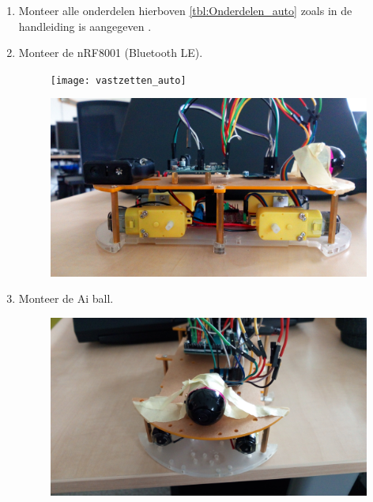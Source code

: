 \documentclass[12pt,a4paper]{article}
\begin{document}
\begin{enumerate}
	\item Monteer alle onderdelen hierboven \ref{tbl:Onderdelen_auto} zoals in de handleiding is aangegeven \cite{DIY_auto_hl}. 
	\item Monteer de nRF8001 (Bluetooth LE).
	\begin{figure}[H]
	\centering
	\texttt{[image: vastzetten\_auto]}
	\label{fig:vastzetten_auto}
	\end{figure}
	\begin{figure}[H]
		\centering
		\includegraphics[width=0.7\linewidth]{zijkant}
		\label{fig:vastzetten_zijkant_auto}
	\end{figure}
	\item Monteer de Ai ball.
	\begin{figure}[H]
		\centering
		\includegraphics[width=0.7\linewidth]{ai_ball}
		\label{fig:vastzetten_aiball}
	\end{figure}	
\end{enumerate}
	
\newpage
\end{document}
